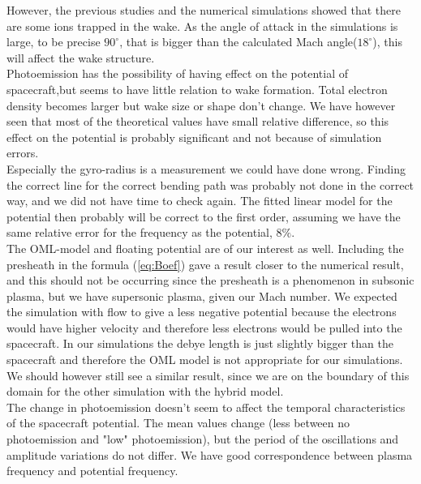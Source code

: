 \documentclass[aip, 
rsi, 
amsmath,
amssymb,
longbibliography,
preprint]{revtex4-1}
\begin{document}
However, the previous studies \cite{P1} and the numerical simulations showed that there are some ions trapped in the wake. As the angle of attack in the simulations is large, to be precise $90^{\circ}$, that is bigger than the calculated Mach angle($18^{\circ}$), this will affect the wake structure.\\

Photoemission has the possibility of having effect on the potential of spacecraft,but seems to have little relation to wake formation. Total electron density becomes larger but wake size or shape don't change. We have however seen that most of the theoretical values have small relative difference, so this effect on the potential is probably significant and not because of simulation errors.\\

Especially the gyro-radius is a measurement we could have done wrong. Finding the correct line for the correct bending path was probably not done in the correct way, and we did not have time to check again. The fitted linear model for the potential then probably will be correct to the first order, assuming we have the same relative error for the frequency as the potential, $8\%$.\\

The OML-model and floating potential are of our interest as well. Including the presheath in the formula (\ref{eq:Boef}) gave a result closer to the numerical result, and this should not be occurring since the presheath is a phenomenon in subsonic plasma, but we have supersonic plasma, given our Mach number. We expected the simulation with flow to give a less negative potential because the electrons would have higher velocity and therefore less electrons would be pulled into the spacecraft. In our simulations the debye length is just slightly bigger than the spacecraft and therefore the OML model is not appropriate for our simulations. We should however still see a similar result, since we are on the boundary of this domain for the other simulation with the hybrid model\cite{P7}.\\

The change in photoemission doesn't seem to affect the temporal characteristics of the spacecraft potential. The mean values change (less between no photoemission and "low" photoemission), but the period of the oscillations and amplitude variations do not differ. We have good correspondence between plasma frequency and potential frequency.\\
\end{document}
